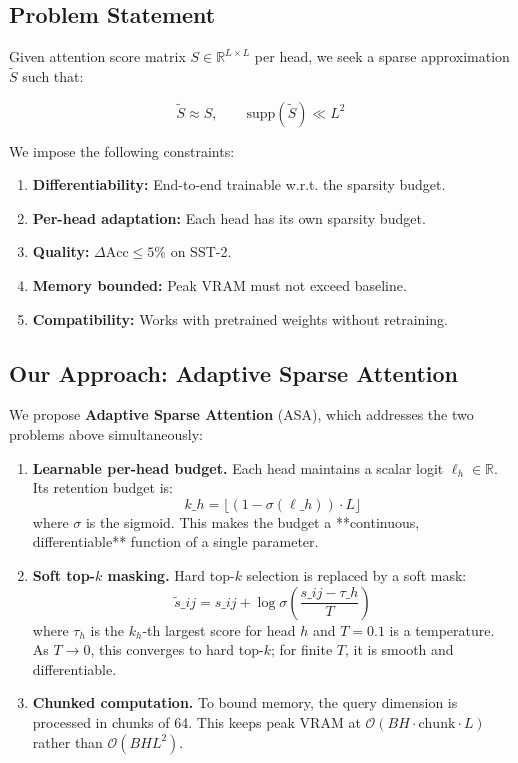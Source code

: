 \subsection{Problem Statement}

Given attention score matrix $S \in \mathbb{R}^{L \times L}$ per head, we 
seek a sparse approximation $\tilde{S}$ such that:

\[
\tilde{S} \approx S, \qquad
\text{supp}(\tilde{S}) \ll L^2
\]

We impose the following constraints:

\begin{enumerate}
\item \textbf{Differentiability:} End-to-end trainable w.r.t. the sparsity budget.
\item \textbf{Per-head adaptation:} Each head has its own sparsity budget.
\item \textbf{Quality:} $\Delta\text{Acc} \leq 5\%$ on SST-2.
\item \textbf{Memory bounded:} Peak VRAM must not exceed baseline.
\item \textbf{Compatibility:} Works with pretrained weights without retraining.

\end{enumerate}
\subsection{Our Approach: Adaptive Sparse Attention}

We propose \textbf{Adaptive Sparse Attention} (ASA), which addresses the two 
problems above simultaneously:

\begin{enumerate}
\item \textbf{Learnable per-head budget.} Each head maintains a scalar logit
  $\ell_h \in \mathbb{R}$. Its retention budget is:
  \[
k\_h = \lfloor (1 - \sigma(\ell\_h)) \cdot L \rfloor
\]
  where $\sigma$ is the sigmoid. This makes the budget a **continuous,
  differentiable** function of a single parameter.

\item \textbf{Soft top-$k$ masking.} Hard top-$k$ selection is replaced by a soft
  mask:
  \[
\tilde{s}\_{ij} = s\_{ij} + \log \sigma\!\left(\frac{s\_{ij} - \tau\_h}{T}\right)
\]
  where $\tau_h$ is the $k_h$-th largest score for head $h$ and $T = 0.1$
  is a temperature. As $T \to 0$, this converges to hard top-$k$; for finite
  $T$, it is smooth and differentiable.

\item \textbf{Chunked computation.} To bound memory, the query dimension is
  processed in chunks of 64. This keeps peak VRAM at $\mathcal{O}(B H \cdot
  \text{chunk} \cdot L)$ rather than $\mathcal{O}(B H L^2)$.

\end{enumerate}
